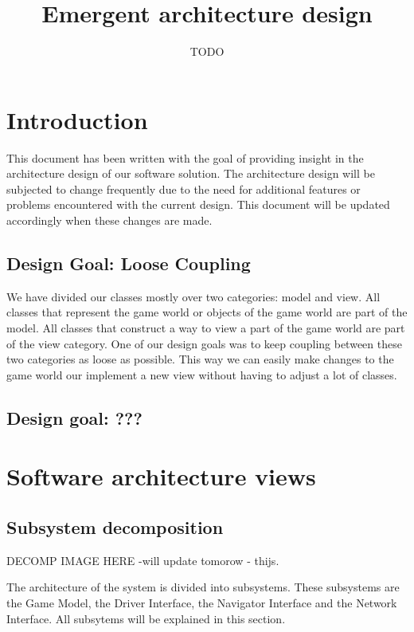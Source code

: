 \documentclass{Article}
\begin{document}
\title{Emergent architecture design}
\author{TODO}
\maketitle

\section{Introduction}

This document has been written with the goal of providing insight in the architecture design of our software solution. The architecture design will be subjected to change frequently due to the need for additional features or problems encountered with the current design. This document will be updated accordingly when these changes are made. 
\subsection{Design Goal: Loose Coupling}

We have divided our classes mostly over two categories: model and view. All classes that represent the game world or objects of the game world are part of the model. All classes that construct a way to view a part of the game world are part of the view category. One of our design goals was to keep coupling between these two categories as loose as possible. This way we can easily make changes to the game world our implement a new view without having to adjust a lot of classes.

\subsection{Design goal: ???}

\newpage

\section{Software architecture views}


\subsection{Subsystem decomposition}


DECOMP IMAGE HERE -will update tomorow - thijs.


The architecture of the system is divided into subsystems. These subsystems are the Game Model, the Driver Interface, the Navigator Interface and the Network Interface. All subsytems will be explained in this section.
\end{document}
